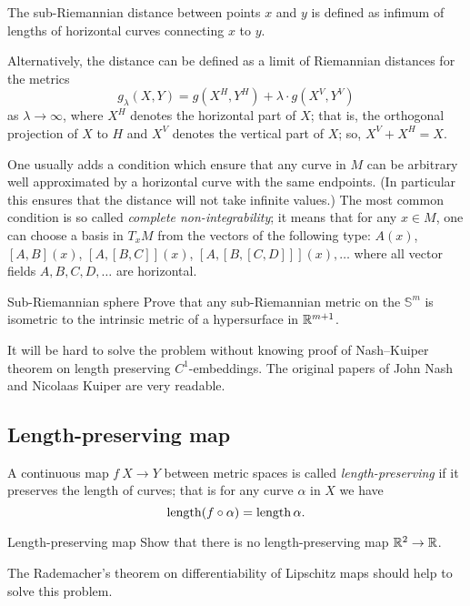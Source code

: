 The sub-Riemannian distance between points $x$ and $y$ is defined as infimum of lengths of horizontal curves connecting $x$ to $y$.

Alternatively, the distance can be defined as a limit of Riemannian distances 
for the metrics 
\[g_\lambda(X,Y)=g(X^H,Y^H)+\lambda\cdot g(X^V,Y^V)\] 
as $\lambda\to \infty$,
where $X^H$ denotes the horizontal part of $X$;
that is, the orthogonal projection of $X$ to $H$
and $X^V$ denotes the vertical part of $X$;
so, $X^V+X^H=X$.

One usually adds a condition which ensure that any curve in $M$ can be arbitrary well approximated by a horizontal curve with the same endpoints.
(In particular this ensures that the distance will not take infinite values.)
The most common condition is so called  {}\emph{complete non-integrability};
it means that for any $x\in M$, 
one can choose a basis in $T_xM$
from the vectors of the following type:
$A(x)$, $[A,B](x)$, $[A,[B,C]](x)$, $[A,[B,[C,D]]](x),\dots$ where all vector fields $A,B,C,D, \dots$ are horizontal.

\begin{pr}{\thm}{Sub-Riemannian sphere}\label{sub-Riemannian} 
Prove that any sub-Riemannian metric 
on the $\mathbb{S}^m$ is isometric to the intrinsic metric of a hypersurface in $\mathbb{R}^{m+1}$.
\end{pr}


It will be hard to solve the problem without knowing proof of Nash--Kuiper theorem on length preserving $C^1$-embeddings.
The original papers of John Nash 
and Nicolaas Kuiper \cite[see][]{nash,kuiper} are very readable.

\subsection*{Length-preserving map\thm}

A continuous map $f\:X\to Y$ between metric spaces is called \emph{length-preserving} if it preserves the length of curves; that is for any curve $\alpha$ in $X$ we have
\[\operatorname{\rm length}(f\circ\alpha)=\operatorname{\rm length}\alpha.\]

\begin{pr}{\thm}{Length-preserving map}\label{two2one} 
Show that there is no length-preserving map $\mathbb{R}^2\to \mathbb{R}$.
\end{pr}

The Rademacher's theorem on differentiability of Lipschitz maps should help to solve this problem. 




